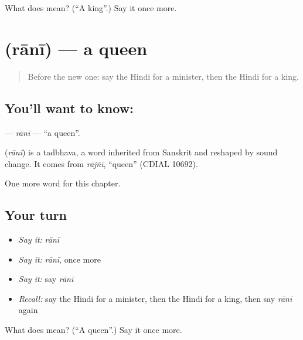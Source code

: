 \begin{tcolorbox}[breakable,colback=teal!4,colframe=teal!35!black,title={Before you move on}]
What does  mean? (\textquotedblleft{}A king\textquotedblright{}.) Say it once more.
\end{tcolorbox}
\section[\texorpdfstring{\hi{रानी} (rānī)}{रानी (rānī)}]{ (rānī) — a queen}

\label{lesson:HI-C196-rani}



\begin{quote}
Before the new one: say the Hindi for a minister, then the Hindi for a king.
\end{quote}

\subsection*{You'll want to know: }
\textbf{} — \emph{rānī} — \textquotedblleft{}a queen\textquotedblright{}.

\begin{cousinweb}
\textbf{} (\emph{rānī}) is a tadbhava, a word inherited from Sanskrit and reshaped by sound change. It comes from \emph{rājñī}, \textquotedblleft{}queen\textquotedblright{} (CDIAL 10692).
\end{cousinweb}

\begin{grammarlens}[title={What you've built}]
One more word for this chapter.
\end{grammarlens}

\subsection*{Your turn}
\begin{itemize}
\raggedright
  \item \emph{Say it:} \emph{rānī}
  \item \emph{Say it:} \emph{rānī}, once more
  \item \emph{Say it:} say \emph{rānī}
  \item \emph{Recall:} say the Hindi for a minister, then the Hindi for a king, then say \emph{rānī} again
\end{itemize}

\begin{tcolorbox}[breakable,colback=teal!4,colframe=teal!35!black,title={Before you move on}]
What does  mean? (\textquotedblleft{}A queen\textquotedblright{}.) Say it once more.
\end{tcolorbox}
